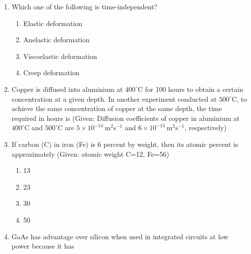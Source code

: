 \documentclass[journal,12pt,onecolumn]{IEEEtran}
\begin{document}
\begin{enumerate}[label=\arabic*)]
\vspace{0.5cm}

\item Which one of the following is time-independent?
\hfill{} \\

\vspace{0.2cm}
\begin{enumerate}[label=\alph*)]
\item Elastic deformation
\item Anelastic deformation
\item Viscoelastic deformation
\item Creep deformation
\end{enumerate}

\vspace{0.3cm}

\item Copper is diffused into aluminium at $400^\circ$C for 100 hours to obtain a certain concentration at a given depth. In another experiment conducted at $500^\circ$C, to achieve the same concentration of copper at the same depth, the time required in hours is (Given: Diffusion coefficients of copper in aluminium at $400^\circ$C and $500^\circ$C are $5\times10^{-14}\ \mathrm{m^2 s^{-1}}$ and $6\times10^{-13}\ \mathrm{m^2 s^{-1}}$, respectively)
\hfill{} \\

\vspace{0.5cm}

\item If carbon (C) in iron (Fe) is 6 percent by weight, then its atomic percent is approximately (Given: atomic weight C=12, Fe=56)
\hfill{} \\

\vspace{0.2cm}
\begin{enumerate}[label=\alph*)]
\item 13
\item 23
\item 30
\item 50
\end{enumerate}

\vspace{0.5cm}

\item GaAs has advantage over silicon when used in integrated circuits at low power because it has
\vspace{0.2cm}
\hfill{} \\


\end{enumerate}
\end{document}
